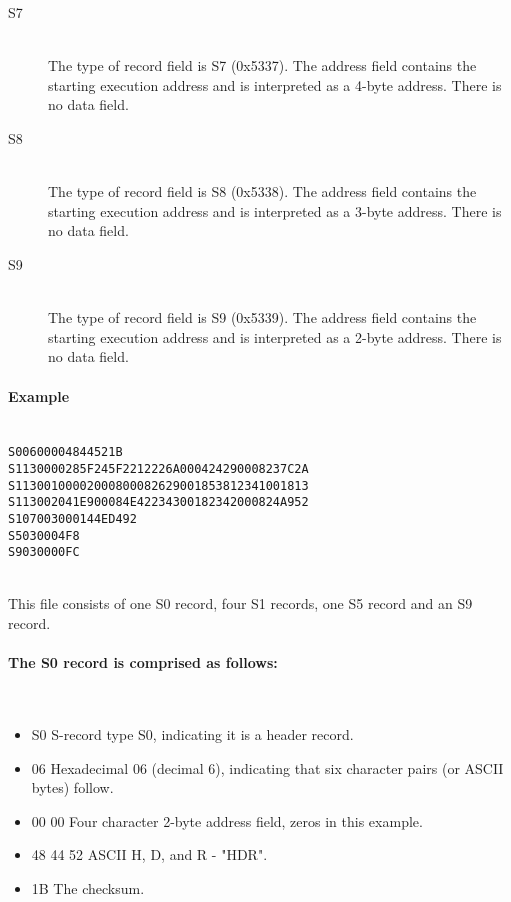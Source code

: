 \begin{description}
                \item[S7]~\\
                    The type of record field is S7 (0x5337). The address field contains the starting execution address and is interpreted as a 4-byte address. There is no data field.

                \item[S8]~\\
                    The type of record field is S8 (0x5338). The address field contains the starting execution address and is interpreted as a 3-byte address. There is no data field.

                \item[S9]~\\
                    The type of record field is S9 (0x5339). The address field contains the starting execution address and is interpreted as a 2-byte address. There is no data field.
            \end{description}

            \paragraph{Example}
                ~\\
                \verb'S00600004844521B'\\
                \verb'S1130000285F245F2212226A000424290008237C2A'\\
                \verb'S11300100002000800082629001853812341001813'\\
                \verb'S113002041E900084E42234300182342000824A952'\\
                \verb'S107003000144ED492'\\
                \verb'S5030004F8'\\
                \verb'S9030000FC'

                ~\\This file consists of one S0 record, four S1 records, one S5 record and an S9 record.

            \paragraph{The S0 record is comprised as follows:}
                ~\\
                \begin{itemize}
                    \item S0 S-record type S0, indicating it is a header record.
                    \item 06 Hexadecimal 06 (decimal 6), indicating that six character pairs (or ASCII bytes) follow.
                    \item 00 00 Four character 2-byte address field, zeros in this example.
                    \item 48 44 52 ASCII H, D, and R - "HDR".
                    \item 1B The checksum.
                \end{itemize}

